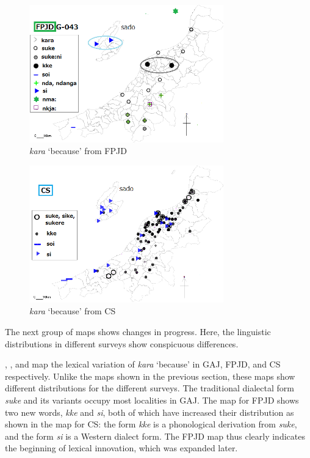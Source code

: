 \documentclass[output=paper]{LSP/langsci}
\begin{document}
\begin{figure}
\includegraphics[width=0.75\textwidth]{illustrations/fuku2_fig4b}
\caption{\textit{kara} `because' from FPJD}
\label{fig:4b}
\end{figure}

\begin{figure}
\includegraphics[width=0.75\textwidth]{illustrations/fuku2_fig4c}
\caption{\textit{kara} `because' from CS}
\label{fig:4c}
\end{figure}

The next group of maps shows changes in progress. Here, the linguistic distributions in different surveys show conspicuous differences. 

, , and  map the lexical variation of \textit{kara} `because'  in \textsc{GAJ}, \textsc{FPJD}, and \textsc{CS} respectively.  Unlike the maps shown in the previous section, these maps show different distributions for the different surveys.  The traditional dialectal form \textit{suke} and its variants occupy most localities in \textsc{GAJ}.  The map for \textsc{FPJD} shows two new words, \textit{kke} and \textit{si}, both of which have increased their distribution as shown in the map for \textsc{CS}: the form \textit{kke} is a phonological derivation from \textit{suke}, and the form \textit{si} is a Western dialect form.  The \textsc{FPJD} map thus clearly indicates the beginning of lexical innovation, which was expanded later.
\end{document}
